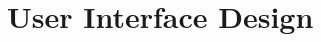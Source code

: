 \documentclass[journal,10pt,onecolumn,compsoc]{IEEEtran}
\begin{document}
	
\newpage


\section{User Interface Design}
\end{document}
